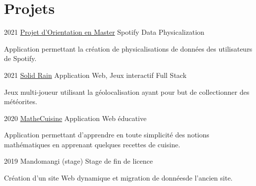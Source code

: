 \documentclass[]{friggeri-cv}
\begin{document}
\vspace{-0.35cm}

\section{Projets}

\begin{entrylist}
  \entry
    {2021}
    {\href{https://github.com/pillowinacoma/printify}{Projet d'Orientation en Master}}
    {Spotify Data Physicalization}
    {
    \vspace{-0.4cm}
    \begin{tightemize}
        \item Application permettant la création de physicalisations de données des utilisateurs de Spotify.
        \item {}
    \end{tightemize}
    }
  \entry
    {2021}
    {\href{https://github.com/pillowinacoma/solidRain}{Solid Rain}}
    {Application Web, Jeux interactif Full Stack}
    {
    \vspace{-0.4cm}
    \begin{tightemize}
        \item Jeux multi-joueur utilisant la géolocalisation ayant pour but  de collectionner des météorites.
        \item {}
    \end{tightemize}
    }
  \entry
    {2020}
    {\href{https://github.com/pillowinacoma/matheCuisine}{MatheCuisine}}
    {Application Web éducative}
    {
    \vspace{-0.4cm}
    \begin{tightemize}
        \item Application permettant d’apprendre en toute simplicité des notions mathématiques en apprenant quelques recettes de cuisine.
        \item{}
    \end{tightemize}
    }


  \entry
    {2019}
    {Mandomangi (stage)}
    {Stage de fin de licence}
    {
    \vspace{-0.4cm}
    \begin{tightemize}
    \item Création d’un site Web dynamique et migration de donnéesde l’ancien site.
    \item {}
    \end{tightemize}
    }
  
\end{entrylist}
\end{document}
